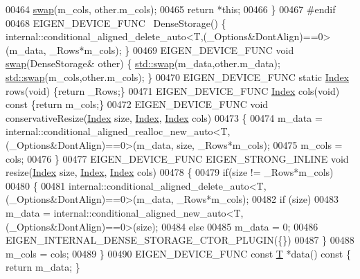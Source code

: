 \begin{DoxyCode}
00464       \hyperlink{endian_8c_a3ca5ecd34b04d6a243c054ac3a57f68d}{swap}(m\_cols, other.m\_cols);
00465       \textcolor{keywordflow}{return} *\textcolor{keyword}{this};
00466     \}
00467 \textcolor{preprocessor}{#endif}
00468     EIGEN\_DEVICE\_FUNC ~DenseStorage() \{ 
      internal::conditional\_aligned\_delete\_auto<T,(\_Options&DontAlign)==0>(m\_data, \_Rows*m\_cols); \}
00469     EIGEN\_DEVICE\_FUNC \textcolor{keywordtype}{void} \hyperlink{endian_8c_a3ca5ecd34b04d6a243c054ac3a57f68d}{swap}(DenseStorage& other) \{ \hyperlink{endian_8c_a3ca5ecd34b04d6a243c054ac3a57f68d}{std::swap}(m\_data,other.m\_data); 
      \hyperlink{endian_8c_a3ca5ecd34b04d6a243c054ac3a57f68d}{std::swap}(m\_cols,other.m\_cols); \}
00470     EIGEN\_DEVICE\_FUNC \textcolor{keyword}{static} \hyperlink{namespace_eigen_a62e77e0933482dafde8fe197d9a2cfde}{Index} rows(\textcolor{keywordtype}{void}) \{\textcolor{keywordflow}{return} \_Rows;\}
00471     EIGEN\_DEVICE\_FUNC \hyperlink{namespace_eigen_a62e77e0933482dafde8fe197d9a2cfde}{Index} cols(\textcolor{keywordtype}{void})\textcolor{keyword}{ const }\{\textcolor{keywordflow}{return} m\_cols;\}
00472     EIGEN\_DEVICE\_FUNC \textcolor{keywordtype}{void} conservativeResize(\hyperlink{namespace_eigen_a62e77e0933482dafde8fe197d9a2cfde}{Index} size, \hyperlink{namespace_eigen_a62e77e0933482dafde8fe197d9a2cfde}{Index}, \hyperlink{namespace_eigen_a62e77e0933482dafde8fe197d9a2cfde}{Index} cols)
00473     \{
00474       m\_data = internal::conditional\_aligned\_realloc\_new\_auto<T,(\_Options&DontAlign)==0>(m\_data, size, 
      \_Rows*m\_cols);
00475       m\_cols = cols;
00476     \}
00477     EIGEN\_DEVICE\_FUNC EIGEN\_STRONG\_INLINE \textcolor{keywordtype}{void} resize(\hyperlink{namespace_eigen_a62e77e0933482dafde8fe197d9a2cfde}{Index} size, \hyperlink{namespace_eigen_a62e77e0933482dafde8fe197d9a2cfde}{Index}, 
      \hyperlink{namespace_eigen_a62e77e0933482dafde8fe197d9a2cfde}{Index} cols)
00478     \{
00479       \textcolor{keywordflow}{if}(size != \_Rows*m\_cols)
00480       \{
00481         internal::conditional\_aligned\_delete\_auto<T,(\_Options&DontAlign)==0>(m\_data, \_Rows*m\_cols);
00482         \textcolor{keywordflow}{if} (size)
00483           m\_data = internal::conditional\_aligned\_new\_auto<T,(\_Options&DontAlign)==0>(size);
00484         \textcolor{keywordflow}{else}
00485           m\_data = 0;
00486         EIGEN\_INTERNAL\_DENSE\_STORAGE\_CTOR\_PLUGIN(\{\})
00487       \}
00488       m\_cols = cols;
00489     \}
00490     EIGEN\_DEVICE\_FUNC \textcolor{keyword}{const} \hyperlink{group___sparse_core___module_class_eigen_1_1_triplet}{T} *data()\textcolor{keyword}{ const }\{ \textcolor{keywordflow}{return} m\_data; \}

\end{DoxyCode}
